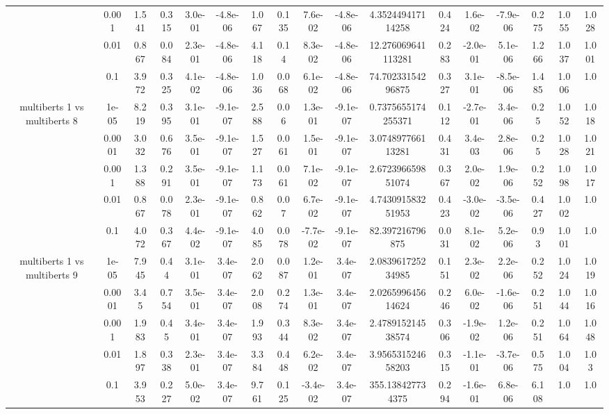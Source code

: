\begin{tabular}{|c|c|c|c|c|c|c|c|c|c|c|c|c|c|c|c|c|}
 & 0.001 & 1.541 & 0.315 & 3.0e-01 & -4.8e-06 & 1.067 & 0.135 & 7.6e-02 & -4.8e-06 & 4.352449417114258 & 0.424 & 1.6e-02 & -7.9e-06 & 0.275 & 1.055 & 1.028 \\
 & 0.01 & 0.867 & 0.084 & 2.3e-01 & -4.8e-06 & 4.118 & 0.14 & 8.3e-02 & -4.8e-06 & 12.276069641113281 & 0.283 & -2.0e-01 & 5.1e-06 & 1.266 & 1.037 & 1.001 \\
 & 0.1 & 3.972 & 0.325 & 4.1e-02 & -4.8e-06 & 1.036 & 0.068 & 6.1e-02 & -4.8e-06 & 74.70233154296875 & 0.327 & 3.1e-01 & -8.5e-06 & 1.485 & 1.006 & 1.0 \\
\hline
\multirow{5}{*}{multiberts 1 vs multiberts 8} & 1e-05 & 8.219 & 0.395 & 3.1e-01 & -9.1e-07 & 2.588 & 0.06 & 1.3e-01 & -9.1e-07 & 0.7375655174255371 & 0.112 & -2.7e-01 & 3.4e-06 & 0.25 & 1.052 & 1.018 \\
 & 0.0001 & 3.032 & 0.676 & 3.5e-01 & -9.1e-07 & 1.527 & 0.061 & 1.5e-01 & -9.1e-07 & 3.074897766113281 & 0.431 & 3.4e-03 & 2.8e-06 & 0.25 & 1.028 & 1.021 \\
 & 0.001 & 1.388 & 0.291 & 3.5e-01 & -9.1e-07 & 1.173 & 0.061 & 7.1e-02 & -9.1e-07 & 2.672396659851074 & 0.367 & 2.0e-02 & 1.9e-06 & 0.252 & 1.098 & 1.017 \\
 & 0.01 & 0.867 & 0.078 & 2.3e-01 & -9.1e-07 & 0.862 & 0.07 & 6.7e-02 & -9.1e-07 & 4.743091583251953 & 0.423 & -3.0e-02 & -3.5e-06 & 0.427 & 1.002 & 1.0 \\
 & 0.1 & 4.072 & 0.367 & 4.4e-02 & -9.1e-07 & 4.085 & 0.078 & -7.7e-02 & -9.1e-07 & 82.397216796875 & 0.031 & 8.1e-02 & 5.2e-06 & 0.93 & 1.001 & 1.0 \\
\hline
\multirow{5}{*}{multiberts 1 vs multiberts 9} & 1e-05 & 7.945 & 0.44 & 3.1e-01 & 3.4e-07 & 2.062 & 0.087 & 1.2e-01 & 3.4e-07 & 2.083961725234985 & 0.151 & 2.3e-02 & 2.2e-06 & 0.252 & 1.024 & 1.019 \\
 & 0.0001 & 3.45 & 0.754 & 3.5e-01 & 3.4e-07 & 2.008 & 0.274 & 1.3e-01 & 3.4e-07 & 2.026599645614624 & 0.246 & 6.0e-02 & -1.6e-06 & 0.251 & 1.044 & 1.016 \\
 & 0.001 & 1.983 & 0.45 & 3.4e-01 & 3.4e-07 & 1.993 & 0.344 & 8.3e-02 & 3.4e-07 & 2.478915214538574 & 0.306 & -1.9e-02 & 1.2e-06 & 0.251 & 1.064 & 1.048 \\
 & 0.01 & 1.897 & 0.338 & 2.3e-01 & 3.4e-07 & 3.384 & 0.448 & 6.2e-02 & 3.4e-07 & 3.956531524658203 & 0.315 & -1.1e-01 & -3.7e-06 & 0.575 & 1.004 & 1.03 \\
 & 0.1 & 3.953 & 0.227 & 5.0e-02 & 3.4e-07 & 9.761 & 0.125 & -3.4e-02 & 3.4e-07 & 355.138427734375 & 0.294 & -1.6e-01 & 6.8e-06 & 6.108 & 1.0 & 1.0 \\

\end{tabular}
